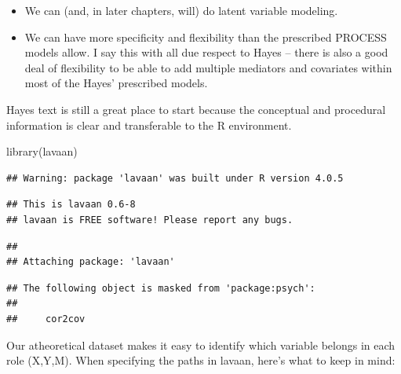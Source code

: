 \documentclass[
  english,
]{book}
\newenvironment{Shaded}{\begin{snugshade}}{\end{snugshade}}
\newcommand{\FunctionTok}[1]{\textcolor[rgb]{0.00,0.00,0.00}{#1}}
\newcommand{\NormalTok}[1]{#1}
\providecommand{\tightlist}{%
  \setlength{\itemsep}{0pt}\setlength{\parskip}{0pt}}
\begin{document}
\begin{itemize}
\tightlist
\item
  We can (and, in later chapters, will) do latent variable modeling.
\item
  We can have more specificity and flexibility than the prescribed PROCESS models allow. I say this with all due respect to Hayes -- there is also a good deal of flexibility to be able to add multiple mediators and covariates within most of the Hayes' prescribed models.
\end{itemize}

Hayes text is still a great place to start because the conceptual and procedural information is clear and transferable to the R environment.

\begin{Shaded}
\begin{Highlighting}[]
\FunctionTok{library}\NormalTok{(lavaan)}
\end{Highlighting}
\end{Shaded}

\begin{verbatim}
## Warning: package 'lavaan' was built under R version 4.0.5
\end{verbatim}

\begin{verbatim}
## This is lavaan 0.6-8
## lavaan is FREE software! Please report any bugs.
\end{verbatim}

\begin{verbatim}
## 
## Attaching package: 'lavaan'
\end{verbatim}

\begin{verbatim}
## The following object is masked from 'package:psych':
## 
##     cor2cov
\end{verbatim}

Our atheoretical dataset makes it easy to identify which variable belongs in each role (X,Y,M). When specifying the paths in lavaan, here's what to keep in mind:
\end{document}
